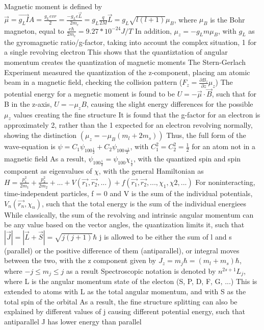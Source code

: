 \documentclass[11 pt, twoside]{article}
\newenvironment{outline*}
{
	\begin{outline}[enumerate]
	}
	{\end{outline}
}
\begin{document}
\begin{outline*}
	\2 Magnetic moment is defined by $\vec{\mu} = \vec{g_LI}A = \frac{g_Levr}{2} = \frac{-g_Le\vec{L}}{2m_e} = g_L\frac{q}{2M}\vec{L} = g_L\sqrt{l(l + 1)}\mu_B$, where $\mu_B$ is the Bohr magneton, equal to $\frac{e\hbar}{2m_e} = 9.27 * 10^{-24} J/T$
		\3 In addition, $\mu_z = -g_Lm\mu_B$, with $g_L$ as the gyromagnetic ratio/g-factor, taking into account the complex situation, 1 for a single revolving electron
		\3 This shows that the quantiztation of angular momentum creates the quantization of magnetic moments
		\3 The Stern-Gerlach Experiment measured the quantization of the z-component, placing am atomic beam in a magnetic field, checking the collision pattern ($F_z = \frac{\partial B_z}{\partial z}\mu_z$)
	\2 The potential energy for a megnetic moment is found to be $U = -\vec{\mu} \cdot \vec{B}$, such that for B in the z-axis, $U = -\mu_zB$, causing the slight energy differences for the possible $\mu_z$ values creating the fine structure
	\2 It is found that the g-factor for an electron is approximately 2, rather than the 1 expected for an electron revolving normally, showing the distinction $(\mu_z = -\mu_B(m_l + 2m_s))$
	\2 Thus, the full form of the wave-equation is $\psi = C_1\psi_{100\frac{1}{2}} + C_2\psi_{100\frac{-1}{2}}$, with $C_1^2 = C_2^2 = \frac{1}{2}$ for an atom not in a magnetic field
		\3 As a result, $\psi_{100\frac{1}{2}} = \psi_{100}\chi_{\frac{1}{2}}$, with the quantized spin and spin component as eigenvalues of $\chi$, with the general Hamiltonian as $H = \frac{p_1^2}{2m_1} + \frac{p_2^2}{2m_2} + ... + V(\vec{r_1}, \vec{r_2}, ...) + f(\vec{r_1}, \vec{r_2}, ..., \chi_{1}, \chi{2}, ...)$
		\3 For noninteracting, time-independent particles, f = 0 and V is the sum of the individual potentials, $V_n(\vec{r_n}, \chi_n)$, such that the total energy is the sum of the individual energiees
\1 While classically, the sum of the revolving and intrinsic angular momentum can be any value based on the vector angles, the quantization limits it, such that $|\vec{J}| = |\vec{L} + \vec{S}| = \sqrt{j(j + 1)}\hbar$
	\2 j is allowed to be either the sum of l and s (parallel) or the positive difference of them (antiparallel), or integral moves between the two, with the z component given by $J_z = m_j\hbar = (m_l + m_s)\hbar$, where $-j \leq m_j \leq j$ as a result
		\3 Spectroscopic notation is denoted by $n^{2s + 1}L_j$, where L is the angular momentum state of the electon (S, P, D, F, G, ...)
			\4 This is extended to atoms with L as the total angular momentum, and with S as the total spin of the orbital
		\3 As a result, the fine structure splitting can also be explained by different values of j causing different potential energy, such that antiparallel J has lower energy than parallel

\end{outline*}
\end{document}

